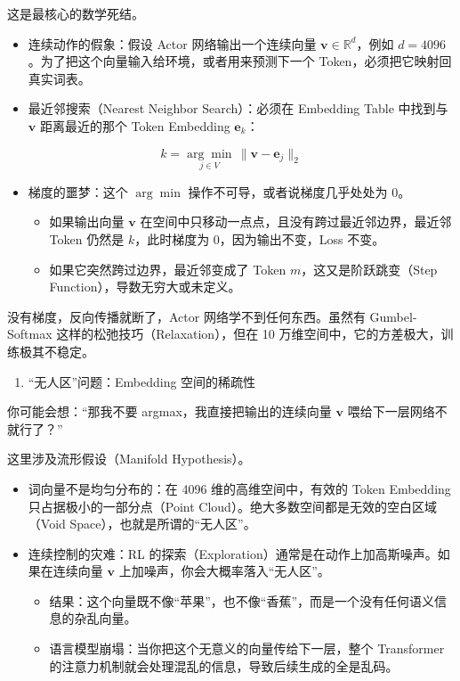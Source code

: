 这是最核心的数学死结。

\begin{itemize}
\tightlist
\item
  连续动作的假象：假设 Actor 网络输出一个连续向量 \(\mathbf{v}\in\mathbb{R}^d\)，例如 \(d=4096\)。为了把这个向量输入给环境，或者用来预测下一个 Token，必须把它映射回真实词表。
\item
{}
  最近邻搜索（Nearest Neighbor Search）：必须在 Embedding Table 中找到与 \(\mathbf{v}\) 距离最近的那个 Token Embedding \(\mathbf{e}_k\)：
\end{itemize}

\[
k
=
\underset{j\in V}{\arg\min}\,
\lVert \mathbf{v}-\mathbf{e}_j\rVert_2
\]

\begin{itemize}
\tightlist
\item
  梯度的噩梦：这个 \(\arg\min\) 操作不可导，或者说梯度几乎处处为 0。

  \begin{itemize}
  \tightlist
  \item
    如果输出向量 \(\mathbf{v}\) 在空间中只移动一点点，且没有跨过最近邻边界，最近邻 Token 仍然是 \(k\)，此时梯度为 0，因为输出不变，Loss 不变。
  \item
    如果它突然跨过边界，最近邻变成了 Token \(m\)，这又是阶跃跳变（Step Function），导数无穷大或未定义。
  \end{itemize}
\end{itemize}

没有梯度，反向传播就断了，Actor 网络学不到任何东西。虽然有 Gumbel-Softmax 这样的松弛技巧（Relaxation），但在 10 万维空间中，它的方差极大，训练极其不稳定。

\begin{enumerate}
\def\labelenumi{\arabic{enumi}.}
\setcounter{enumi}{1}
\tightlist
\item
  ``无人区''问题：Embedding 空间的稀疏性
\end{enumerate}

你可能会想：``那我不要 argmax，我直接把输出的连续向量 \(\mathbf{v}\) 喂给下一层网络不就行了？''

这里涉及流形假设（Manifold Hypothesis）。

\begin{itemize}
\tightlist
\item
  词向量不是均匀分布的：在 4096 维的高维空间中，有效的 Token Embedding 只占据极小的一部分点（Point Cloud）。绝大多数空间都是无效的空白区域（Void Space），也就是所谓的``无人区''。
\item
  连续控制的灾难：RL 的探索（Exploration）通常是在动作上加高斯噪声。如果在连续向量 \(\mathbf{v}\) 上加噪声，你会大概率落入``无人区''。

  \begin{itemize}
  \tightlist
  \item
    结果：这个向量既不像``苹果''，也不像``香蕉''，而是一个没有任何语义信息的杂乱向量。
  \item
    语言模型崩塌：当你把这个无意义的向量传给下一层，整个 Transformer 的注意力机制就会处理混乱的信息，导致后续生成的全是乱码。
  \end{itemize}
\end{itemize}

